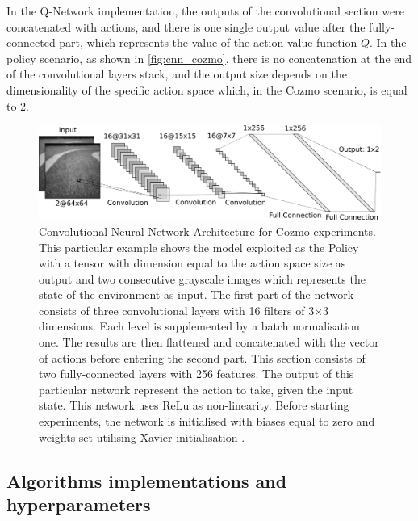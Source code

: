 In the Q-Network implementation, the outputs of the convolutional section were concatenated with actions, and there is one single output value after the fully-connected part, which represents the value of the action-value function $Q$.
In the policy scenario, as shown in \vref{fig:cnn_cozmo}, there is no concatenation at the end of the convolutional layers stack, and the output size depends on the dimensionality of the specific action space which, in the Cozmo scenario, is equal to 2.

\begin{figure}

    \centering
    \includegraphics[width=\textwidth]{img/cnn_cozmo.png}
    \caption[Convolutional Neural Network Architecture for Cozmo experiments]{ Convolutional Neural Network Architecture for Cozmo experiments.
        This particular example shows the model exploited as the Policy with a tensor with dimension equal to the action space size as output and two consecutive grayscale images which represents the state of the environment as input.
        The first part of the network consists of three convolutional layers with 16 filters of 3$\times$3 dimensions.
        Each level is supplemented by a batch normalisation one.
        The results are then flattened and concatenated with the vector of actions before entering the second part.
        This section consists of two fully-connected layers with 256 features.
        The output of this particular network represent the action to take, given the input state.
        This network uses ReLu as non-linearity.
        Before starting experiments, the network is initialised with biases equal to zero and weights set utilising Xavier initialisation \cite{glorot2010understanding}.}
    \label{fig:cnn_cozmo}
\end{figure}

\subsection{Algorithms implementations and hyperparameters}

